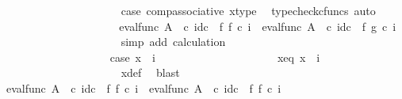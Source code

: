 \begin{isabellebody}
\ \ \ \ \ \ \ \ \ \ \ \ \ \ \ \ \ \ \ \ \isamarkupfalse%
\ case{}\ comp{\isacharunderscore}{\kern0pt}associative{}\ x{\isacharunderscore}{\kern0pt}type\ \isamarkupfalse%
\ {\isacharparenleft}{\kern0pt}typecheck{\isacharunderscore}{\kern0pt}cfuncs{\isacharcomma}{\kern0pt}\ auto{\isacharparenright}{\kern0pt}\isanewline
\ \ \ \ \ \ \ \ \ \ \ \ \ \ \ \ \ \ \isamarkupfalse%
\ \isamarkupfalse%
\ {\isachardoublequoteopen}{\isacharparenleft}{\kern0pt}eval{\isacharunderscore}{\kern0pt}func\ A\ {\isasymOmega}\ {\isasymcirc}\isactrlsub c\ id\isactrlsub c\ {\isasymOmega}\ {\isasymtimes}\isactrlsub f\ f{\isacharparenright}{\kern0pt}\ {\isasymcirc}\isactrlsub c\ {\isasymlangle}{\isasymf}{\isacharcomma}{\kern0pt}i{\isasymrangle}\ {\isacharequal}{\kern0pt}\ {\isacharparenleft}{\kern0pt}eval{\isacharunderscore}{\kern0pt}func\ A\ {\isasymOmega}\ {\isasymcirc}\isactrlsub c\ id\isactrlsub c\ {\isasymOmega}\ {\isasymtimes}\isactrlsub f\ g{\isacharparenright}{\kern0pt}\ {\isasymcirc}\isactrlsub c\ {\isasymlangle}{\isasymf}{\isacharcomma}{\kern0pt}i{\isasymrangle}{\isachardoublequoteclose}\isanewline
\ \ \ \ \ \ \ \ \ \ \ \ \ \ \ \ \ \ \ \ \isamarkupfalse%
\ {\isacharparenleft}{\kern0pt}simp\ add{\isacharcolon}{\kern0pt}\ calculation{\isacharparenright}{\kern0pt}\isanewline
\ \ \ \ \ \ \ \ \ \ \ \ \ \ \isamarkupfalse%
\isanewline
\ \ \ \ \ \ \ \ \ \ \ \ \ \ \ \ \ \ \isamarkupfalse%
\ case{}{\isacharcolon}{\kern0pt}\ {\isachardoublequoteopen}x\ {\isasymnoteq}\ {\isasymlangle}{\isasymf}{\isacharcomma}{\kern0pt}i{\isasymrangle}{\isachardoublequoteclose}\isanewline
\ \ \ \ \ \ \ \ \ \ \ \ \ \ \ \ \ \ \isamarkupfalse%
\ \isamarkupfalse%
\ x{\isacharunderscore}{\kern0pt}eq{\isacharcolon}{\kern0pt}\ {\isachardoublequoteopen}x\ {\isacharequal}{\kern0pt}\ {\isasymlangle}{\isasymt}{\isacharcomma}{\kern0pt}i{\isasymrangle}{\isachardoublequoteclose}\isanewline
\ \ \ \ \ \ \ \ \ \ \ \ \ \ \ \ \ \ \ \ \isamarkupfalse%
\ x{\isacharunderscore}{\kern0pt}def{}\ \isamarkupfalse%
\ blast\isanewline
\ \ \ \ \ \ \ \ \ \ \ \ \ \ \ \ \ \ \isamarkupfalse%
\ {\isachardoublequoteopen}{\isacharparenleft}{\kern0pt}eval{\isacharunderscore}{\kern0pt}func\ A\ {\isasymOmega}\ {\isasymcirc}\isactrlsub c\ {\isacharparenleft}{\kern0pt}id\isactrlsub c\ {\isasymOmega}\ {\isasymtimes}\isactrlsub f\ f{\isacharparenright}{\kern0pt}{\isacharparenright}{\kern0pt}\ {\isasymcirc}\isactrlsub c\ {\isasymlangle}{\isasymt}{\isacharcomma}{\kern0pt}i{\isasymrangle}\ {\isacharequal}{\kern0pt}\ eval{\isacharunderscore}{\kern0pt}func\ A\ {\isasymOmega}\ {\isasymcirc}\isactrlsub c\ {\isacharparenleft}{\kern0pt}{\isacharparenleft}{\kern0pt}id\isactrlsub c\ {\isasymOmega}\ {\isasymtimes}\isactrlsub f\ f{\isacharparenright}{\kern0pt}\ {\isasymcirc}\isactrlsub c\ {\isasymlangle}{\isasymt}{\isacharcomma}{\kern0pt}i{\isasymrangle}{\isacharparenright}{\kern0pt}{\isachardoublequoteclose}\isanewline

\end{isabellebody}
